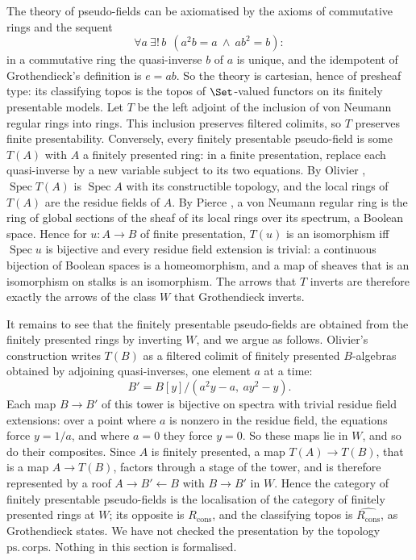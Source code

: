 The theory of pseudo-fields can be axiomatised by the axioms of commutative rings and the sequent
\[
\forall a\ \exists!\,b\ \ (a^2b = a\ \wedge\ ab^2 = b):
\]
in a commutative ring the quasi-inverse $b$ of $a$ is unique, and the idempotent of Grothendieck's definition is $e = ab$. So the theory is cartesian, hence of presheaf type: its classifying topos is the topos of $\Set$-valued functors on its finitely presentable models. Let $T$ be the left adjoint of the inclusion of von Neumann regular rings into rings. This inclusion preserves filtered colimits, so $T$ preserves finite presentability. Conversely, every finitely presentable pseudo-field is some $T(A)$ with $A$ a finitely presented ring: in a finite presentation, replace each quasi-inverse by a new variable subject to its two equations. By Olivier \cite{olivier}, $\operatorname{Spec}T(A)$ is $\operatorname{Spec}A$ with its constructible topology, and the local rings of $T(A)$ are the residue fields of $A$. By Pierce \cite{pierce}, a von Neumann regular ring is the ring of global sections of the sheaf of its local rings over its spectrum, a Boolean space. Hence for $u:A\to B$ of finite presentation, $T(u)$ is an isomorphism iff $\operatorname{Spec}u$ is bijective and every residue field extension is trivial: a continuous bijection of Boolean spaces is a homeomorphism, and a map of sheaves that is an isomorphism on stalks is an isomorphism. The arrows that $T$ inverts are therefore exactly the arrows of the class $W$ that Grothendieck inverts.

It remains to see that the finitely presentable pseudo-fields are obtained from the finitely presented rings by inverting $W$, and we argue as follows. Olivier's construction writes $T(B)$ as a filtered colimit of finitely presented $B$-algebras obtained by adjoining quasi-inverses, one element $a$ at a time:
\[
B' = B[y]/(a^2y - a,\ ay^2 - y).
\]
Each map $B\to B'$ of this tower is bijective on spectra with trivial residue field extensions: over a point where $a$ is nonzero in the residue field, the equations force $y = 1/a$, and where $a = 0$ they force $y = 0$. So these maps lie in $W$, and so do their composites. Since $A$ is finitely presented, a map $T(A)\to T(B)$, that is a map $A\to T(B)$, factors through a stage of the tower, and is therefore represented by a roof $A\to B'\leftarrow B$ with $B\to B'$ in $W$. Hence the category of finitely presentable pseudo-fields is the localisation of the category of finitely presented rings at $W$; its opposite is $R_{\mathrm{cons}}$, and the classifying topos is $\widehat{R_{\mathrm{cons}}}$, as Grothendieck states. We have not checked the presentation by the topology $\mathrm{ps.\,corps}$. Nothing in this section is formalised.

